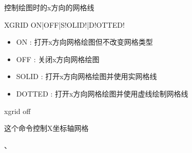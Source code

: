 \label{cmd:xgrid}

控制绘图时的x方向的网格线

\begin{SACSTX}
XGRID ON|OFF|S!OLID!|D!OTTED!
\end{SACSTX}

\begin{itemize}
\item ON : 打开x方向网格绘图但不改变网格类型 
\item OFF : 关闭x方向网格绘图 
\item SOLID : 打开x方向网格绘图并使用实网格线 
\item DOTTED : 打开x方向网格绘图并使用虚线绘制网格线 
\end{itemize}

\begin{SACDFT}
xgrid off
\end{SACDFT}

这个命令控制X坐标轴网格

、
